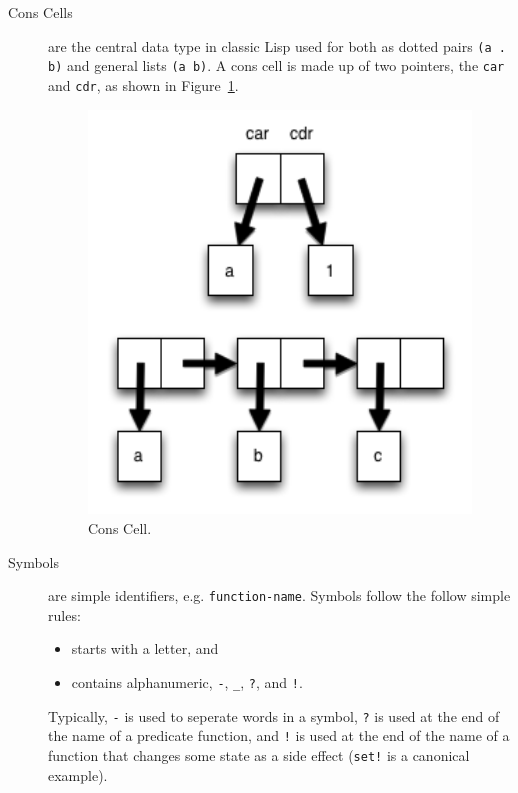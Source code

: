 \documentclass[12pt]{article}
\begin{document}
\begin{description}

\item[Cons Cells] are the central data type in classic Lisp used for
  both as dotted pairs \verb|(a .  b)| and general lists \verb|(a b)|.
  A cons cell is made up of two pointers, the \verb|car| and
  \verb|cdr|, as shown in Figure~\ref{fig:conscell}.

\begin{figure}[htbp] %
   \centering
   \includegraphics[width=5in]{conscell.png} 
\caption{Cons Cell.}
\label{fig:conscell}
\end{figure}

\item[Symbols] are simple identifiers, e.g. \verb|function-name|.
Symbols follow the follow simple rules: 

\begin{itemize}
\item starts with a letter, and
\item contains alphanumeric, \verb|-|, \verb|_|, \verb|?|, and \verb|!|.
\end{itemize}

Typically, \verb|-| is used to seperate words in a symbol, \verb|?| is
used at the end of the name of a predicate function, and \verb|!| is
used at the end of the name of a function that changes some state as a
side effect (\verb|set!| is a canonical example).


\end{description}
\end{document}
